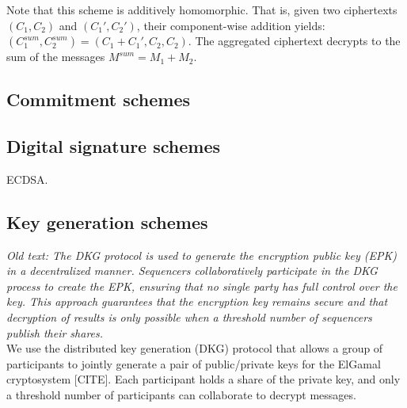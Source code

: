 

Note that this scheme is additively homomorphic. That is, given two ciphertexts $(C_1, C_2)$ and $(C_1', C_2')$, their component-wise addition yields: $(C_1^{sum}, C_2^{sum}) = (C_1 + C_1', C_2, C_2)$. The aggregated ciphertext decrypts to the sum of the messages $M^{sum} = M_1 + M_2$.


\subsection{Commitment schemes}
\label{sec:cryptographic-primitives:commitments}


\subsection{Digital signature schemes}
\label{sec:cryptographic-primitives:signatures}

ECDSA.

\subsection{Key generation schemes}
\label{sec:cryptographic-primitives:dkg}

\textit{Old text: The DKG protocol is used to generate the encryption public key (EPK) in a decentralized manner. Sequencers collaboratively participate in the DKG process to create the EPK, ensuring that no single party has full control over the key. This approach guarantees that the encryption key remains secure and that decryption of results is only possible when a threshold number of sequencers publish their shares.}\\

We use the distributed key generation (DKG) protocol that allows a group of participants to jointly generate a pair of public/private keys for the ElGamal cryptosystem [CITE]. Each participant holds a share of the private key, and only a threshold number of participants can collaborate to decrypt messages. 

